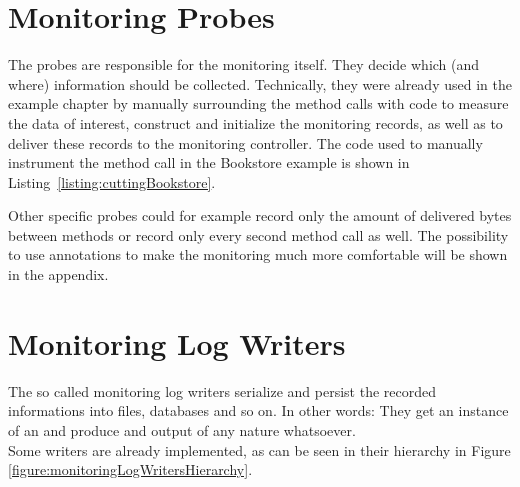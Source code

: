		\setJavaCodeListing
		


	\section{Monitoring Probes}

The probes are responsible for the monitoring itself. They decide which (and where) information should be collected. Technically, they were already used in the example chapter by manually surrounding the method calls with code to measure the data of interest, %
construct and initialize the monitoring records, as well as to deliver these records to the monitoring controller. %
The code used to manually instrument the method call in the Bookstore example is %
shown in Listing~\ref{listing:cuttingBookstore}. %


		

		\noindent Other specific probes could for example record only the amount of delivered bytes between methods or record only every second method call as well. The possibility to use annotations to make the monitoring much more comfortable will be shown in the appendix.

	\section{Monitoring Log Writers}\label{sec:monitoring-log-writers}

		The so called monitoring log writers serialize and persist the recorded informations into files, databases and so on. In other words: They get an instance of an  and produce and output of any nature whatsoever.\\
		Some writers are already implemented, as can be seen in their hierarchy in Figure \ref{figure:monitoringLogWritersHierarchy}.


